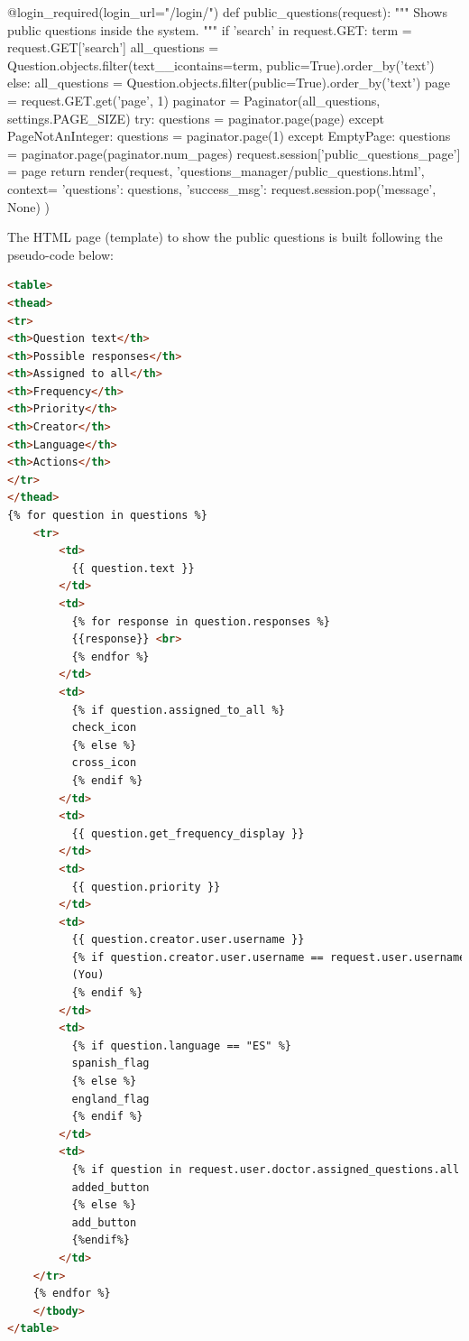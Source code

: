 \documentclass[12pt,english]{article}
\begin{document}
\begin{python}[caption={Method to show public questions page}, captionpos=b]
  @login_required(login_url="/login/")
  def public_questions(request):
      """
      Shows public questions inside the system.
      """
      if 'search' in request.GET:
          term = request.GET['search']
          all_questions = Question.objects.filter(text__icontains=term, public=True).order_by('text')
      else:
          all_questions = Question.objects.filter(public=True).order_by('text')
      page = request.GET.get('page', 1)
      paginator = Paginator(all_questions, settings.PAGE_SIZE)
      try:
          questions = paginator.page(page)
      except PageNotAnInteger:
          questions = paginator.page(1)
      except EmptyPage:
          questions = paginator.page(paginator.num_pages)
      request.session['public_questions_page'] = page
      return render(request, 'questions_manager/public_questions.html', context={
          'questions': questions,
          'success_msg': request.session.pop('message', None)
      })
\end{python}

The HTML page (template) to show the public questions is built following the pseudo-code below:
\begin{lstlisting}[language=html, caption={Pseudo-code to generate public questions template page}, captionpos=b]
<table>
<thead>
<tr>
<th>Question text</th>
<th>Possible responses</th>
<th>Assigned to all</th>
<th>Frequency</th>
<th>Priority</th>
<th>Creator</th>
<th>Language</th>
<th>Actions</th>
</tr>
</thead>
{% for question in questions %}
    <tr>
        <td>
          {{ question.text }}
        </td>
        <td>
          {% for response in question.responses %}
          {{response}} <br>
          {% endfor %}
        </td>
        <td>
          {% if question.assigned_to_all %}
          check_icon
          {% else %}
          cross_icon
          {% endif %}
        </td>
        <td>
          {{ question.get_frequency_display }}
        </td>
        <td>
          {{ question.priority }}
        </td>
        <td>
          {{ question.creator.user.username }}
          {% if question.creator.user.username == request.user.username %}
          (You)
          {% endif %}
        </td>
        <td>
          {% if question.language == "ES" %}
          spanish_flag
          {% else %}
          england_flag
          {% endif %}
        </td>
        <td>
          {% if question in request.user.doctor.assigned_questions.all %}
          added_button
          {% else %}
          add_button
          {%endif%}
        </td>
    </tr>
    {% endfor %}
    </tbody>
</table>
\end{lstlisting}
\end{document}
